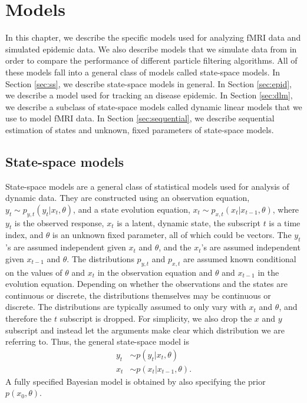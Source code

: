 \chapter{Models \label{ch:models}}

In this chapter, we describe the specific models used for analyzing fMRI data and simulated epidemic data. We also describe models that we simulate data from in order to compare the performance of different particle filtering algorithms. All of these models fall into a general class of models called state-space models. In Section \ref{sec:ss}, we describe state-space models in general. In Section \ref{sec:epid}, we describe a model used for tracking an disease epidemic. In Section \ref{sec:dlm}, we describe a subclass of state-space models called dynamic linear models that we use to model fMRI data. In Section \ref{sec:sequential}, we describe sequential estimation of states and unknown, fixed parameters of state-space models.

\section{State-space models \label{sec:ss}}

State-space models are a general class of statistical models used for analysis of dynamic data.  They are constructed using an observation equation, $y_t \sim p_{y,t}(y_t|x_t,\theta)$, and a state evolution equation, $x_t \sim p_{x,t}(x_t|x_{t-1},\theta)$, where $y_t$ is the observed response, $x_t$ is a latent, dynamic state, the subscript $t$ is a time index, and $\theta$ is an unknown fixed parameter, all of which could be vectors. The $y_t$'s are assumed independent given $x_t$ and $\theta$, and the $x_t$'s are assumed independent given $x_{t-1}$ and $\theta$. The distributions $p_{y,t}$ and $p_{x,t}$ are assumed known conditional on the values of $\theta$ and $x_t$ in the observation equation and $\theta$ and $x_{t-1}$ in the evolution equation. Depending on whether the observations and the states are continuous or discrete, the distributions themselves may be continuous or discrete. The distributions are typically assumed to only vary with $x_t$ and $\theta$, and therefore the $t$ subscript is dropped. For simplicity, we also drop the $x$ and $y$ subscript and instead let the arguments make clear which distribution we are referring to. Thus, the general state-space model is
\begin{align}
y_t &\sim p(y_t|x_t,\theta) \label{eqn:obs} \\
x_t &\sim p(x_t|x_{t-1},\theta). \label{eqn:state}
\end{align}
A fully specified Bayesian model is obtained by also specifying the prior $p(x_0,\theta)$.

